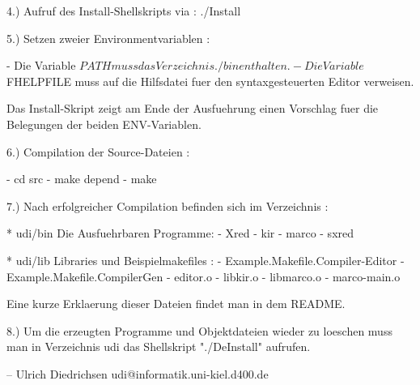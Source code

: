 4.)  Aufruf des Install-Shellskripts via : ./Install

5.)  Setzen zweier Environmentvariablen :

      - Die Variable $PATH muss das Verzeichnis ./bin enthalten.
      - Die Variable $FHELPFILE muss auf die Hilfsdatei fuer den 
        syntaxgesteuerten Editor verweisen.

      Das Install-Skript zeigt am Ende der Ausfuehrung einen Vorschlag
      fuer die Belegungen der beiden ENV-Variablen.

6.)   Compilation der Source-Dateien :

      - cd src
      - make depend
      - make

7.)   Nach erfolgreicher Compilation befinden sich im Verzeichnis :

      * udi/bin   Die Ausfuehrbaren Programme:
                  - Xred
                  - kir
                  - marco
                  - sxred

      * udi/lib   Libraries und Beispielmakefiles :
                  - Example.Makefile.Compiler-Editor
                  - Example.Makefile.CompilerGen
                  - editor.o
                  - libkir.o
                  - libmarco.o
                  - marco-main.o

      Eine kurze Erklaerung dieser Dateien findet man in dem README.

8.)   Um die erzeugten Programme und Objektdateien wieder zu loeschen
      muss man in Verzeichnis udi das Shellskript "./DeInstall" aufrufen.


-- 
Ulrich Diedrichsen      udi@informatik.uni-kiel.d400.de


